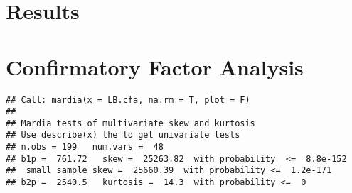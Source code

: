 \documentclass[
  english,
  man]{apa6}
\begin{document}
\hypertarget{results}{%
\section{Results}\label{results}}

\hypertarget{confirmatory-factor-analysis}{%
\section{Confirmatory Factor Analysis}\label{confirmatory-factor-analysis}}

\begin{verbatim}
## Call: mardia(x = LB.cfa, na.rm = T, plot = F)
## 
## Mardia tests of multivariate skew and kurtosis
## Use describe(x) the to get univariate tests
## n.obs = 199   num.vars =  48 
## b1p =  761.72   skew =  25263.82  with probability  <=  8.8e-152
##  small sample skew =  25660.39  with probability <=  1.2e-171
## b2p =  2540.5   kurtosis =  14.3  with probability <=  0
\end{verbatim}
\end{document}
